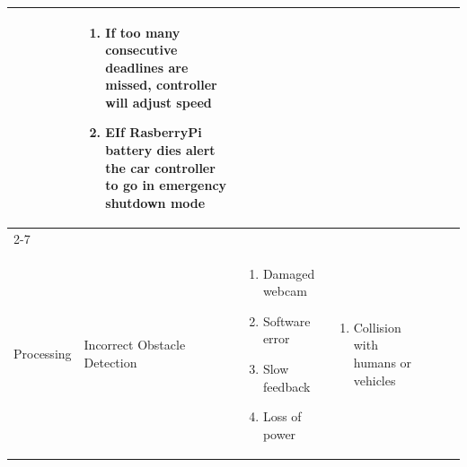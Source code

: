 \documentclass [10pt]{article}
\begin{document}
{\begin{minipage}{\textwidth}
\begin{longtable}{ |p{ }  | p{ } |  p{ } |  p{ } | p{ } | p{ } |  p{ }|}
    
    & \begin{minipage}{.24 \columnwidth} 
                \vspace{2mm}
                \begin{enumerate}
                    \item If too many consecutive deadlines are missed, controller will adjust speed
                    \item EIf RasberryPi battery dies alert the car controller to go in emergency shutdown mode\vspace {1mm}
                \end{enumerate}
        \end{minipage} \\ \cline{2-7}
    
    \multirow{-8}{*}{\begin{minipage} {.12\columnwidth}
    \begin{center}Image \\Processing \end{center}
    \end{minipage}\cellcolor{subsectionC} }
    & \cellcolor{tableCell}\begin{minipage} {.19\columnwidth}
            \begin{center}Incorrect  Obstacle Detection \end{center}
        \end{minipage} 
    & \begin{minipage}{.22\textwidth} 
                \begin{enumerate}
                    \item Damaged webcam
                    \item Software error
                    \item Slow feedback 
                    \item Loss of power\vspace {1mm}
                \end{enumerate}
        \end{minipage}
    & \cellcolor{tableCell}\begin{minipage}{.22\textwidth} 
                \vspace{2mm}
                \begin{enumerate}
                    \item Collision with humans or vehicles\vspace {1mm}
                \end{enumerate}
        \end{minipage}
    & \begin{minipage}{.18\textwidth} 

\end{minipage}
\end{longtable}
\end{minipage}}
\end{document}
